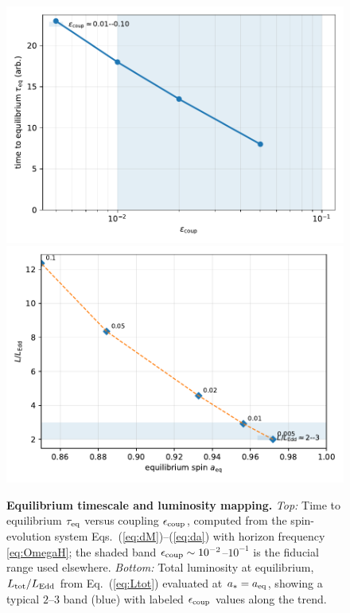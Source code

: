 \documentclass[twocolumn]{aastex701}
\begin{document}
\begin{figure}[!htbp]
  \vspace*{2pt}
  \centering
  \includegraphics[width=.95\linewidth]{Fig4a.pdf}\\[4pt]
  \includegraphics[width=.95\linewidth]{Fig4b.pdf}
  \caption{\textbf{Equilibrium timescale and luminosity mapping.}
  \emph{Top:} Time to equilibrium $\tau_{\rm eq}$ versus coupling $\epsilon_{\rm coup}$,
  computed from the spin-evolution system Eqs.~(\ref{eq:dM})--(\ref{eq:da}) with horizon frequency \eqref{eq:OmegaH};
  the shaded band $\epsilon_{\rm coup}\sim10^{-2}$--$10^{-1}$ is the fiducial range used elsewhere.
  \emph{Bottom:} Total luminosity at equilibrium, $L_{\rm tot}/L_{\rm Edd}$ from Eq.~(\ref{eq:Ltot}) evaluated at $a_\ast=a_{\rm eq}$,
  showing a typical $2$--$3$ band (blue) with labeled $\epsilon_{\rm coup}$ values along the trend.}
\end{figure}
\end{document}
